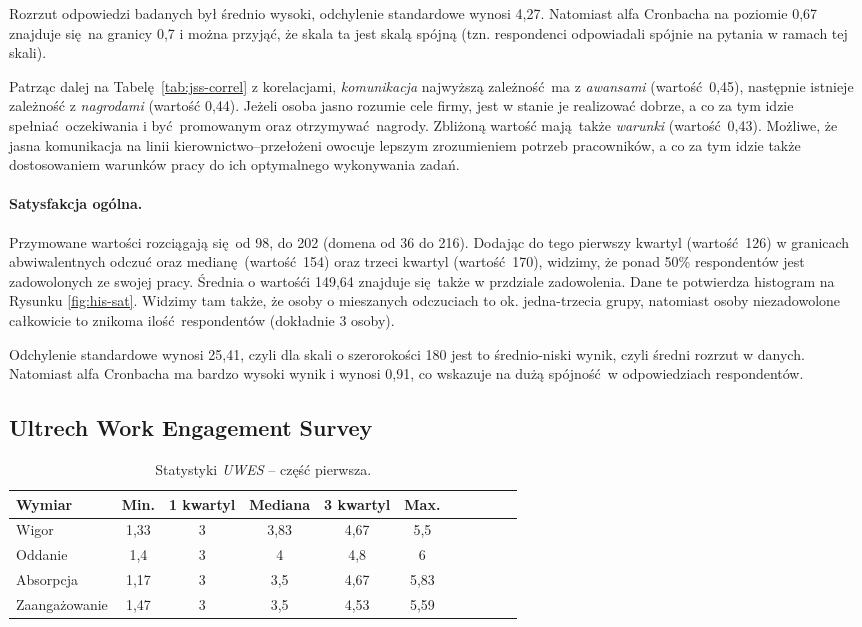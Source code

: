 Rozrzut odpowiedzi badanych był średnio wysoki, odchylenie standardowe wynosi 4,27. Natomiast alfa Cronbacha na poziomie 0,67 znajduje się na granicy 0,7 i można przyjąć, że skala ta jest skalą spójną (tzn. respondenci odpowiadali spójnie na pytania w ramach tej skali).

Patrząc dalej na Tabelę \ref{tab:jss-correl} z korelacjami, \textit{komunikacja} najwyższą zależność ma z \textit{awansami} (wartość 0,45), następnie istnieje zależność z \textit{nagrodami} (wartość 0,44). Jeżeli osoba jasno rozumie cele firmy, jest w stanie je realizować dobrze, a co za tym idzie spełniać oczekiwania i być promowanym oraz otrzymywać nagrody. Zbliżoną wartość mają także \textit{warunki} (wartość 0,43). Możliwe, że jasna komunikacja na linii
kierownictwo--przełożeni owocuje lepszym zrozumieniem potrzeb pracowników, a co za tym idzie także dostosowaniem warunków pracy do ich optymalnego wykonywania zadań.

\paragraph{Satysfakcja ogólna.}
Przymowane wartości rozciągają się od 98, do 202 (domena od 36 do 216). Dodając do tego pierwszy kwartyl (wartość 126) w granicach abwiwalentnych odczuć oraz medianę (wartość 154) oraz trzeci kwartyl (wartość 170), widzimy, że ponad 50\% respondentów jest zadowolonych ze swojej pracy. Średnia o wartośći 149,64 znajduje się także w przdziale zadowolenia. Dane te potwierdza histogram na Rysunku \ref{fig:his-sat}. Widzimy tam także, że osoby o mieszanych odczuciach to ok.
jedna-trzecia grupy, natomiast osoby niezadowolone całkowicie to znikoma ilość respondentów (dokładnie 3 osoby).

Odchylenie standardowe wynosi 25,41, czyli dla skali o szerorokości 180 jest to średnio-niski wynik, czyli średni rozrzut w danych. Natomiast alfa Cronbacha ma bardzo wysoki wynik i wynosi 0,91, co wskazuje na dużą spójność w odpowiedziach respondentów.
\subsection{Ultrech Work Engagement Survey}

\begin{table}[h!]
\begin{center}
\begin{tabular}{l | c c c c c c c c c c}
Wymiar & Min. & 1 kwartyl & Mediana & 3 kwartyl & Max.\\ \hline \hline
Wigor & 1,33 & 3 & 3,83 & 4,67 & 5,5 \\
Oddanie & 1,4 & 3 & 4 & 4,8 & 6 \\
Absorpcja & 1,17 & 3 & 3,5 & 4,67 & 5,83 \\ \hline
Zaangażowanie & 1,47 & 3 & 3,5 & 4,53 & 5,59 \\
\end{tabular}
\end{center}
\caption{Statystyki \emph{UWES} -- część pierwsza.}
\label{tab:uwes-stats-1}
\end{table}

